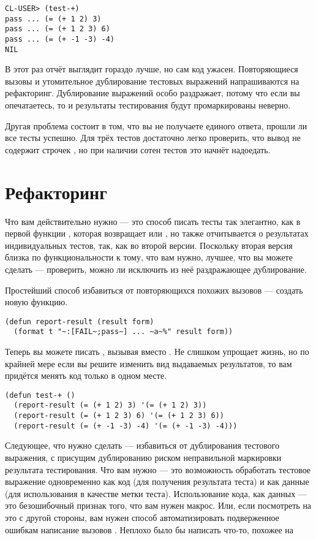 \begin{lstlisting}
CL-USER> (test-+)
pass ... (= (+ 1 2) 3)
pass ... (= (+ 1 2 3) 6)
pass ... (= (+ -1 -3) -4)
NIL
\end{lstlisting}

В этот раз отчёт выглядит гораздо лучше, но сам код ужасен. Повторяющиеся вызовы
 и утомительное дублирование тестовых выражений напрашиваются на
рефакторинг. Дублирование выражений особо раздражает, потому что если вы опечатаетесь, то
и результаты тестирования будут промаркированы неверно.

Другая проблема состоит в том, что вы не получаете единого ответа, прошли ли все
тесты успешно. Для трёх тестов достаточно легко проверить, что вывод не содержит
строчек , но при наличии сотен тестов это начнёт надоедать.

\section{Рефакторинг}

Что вам действительно нужно --- это способ писать тесты так элегантно, как в первой
функции , которая возвращает  или , но также отчитывается о
результатах индивидуальных тестов, так, как во второй версии. Поскольку вторая версия
близка по функциональности к тому, что вам нужно, лучшее, что вы можете сделать ---
проверить, можно ли исключить из неё раздражающее дублирование.

Простейший способ избавиться от повторяющихся похожих вызовов  --- создать
новую функцию.

\begin{lstlisting}
(defun report-result (result form)
  (format t "~:[FAIL~;pass~] ... ~a~%" result form))
\end{lstlisting}

Теперь вы можете писать , вызывая  вместо
. Не слишком упрощает жизнь, но по крайней мере если вы решите изменить вид
выдаваемых результатов, то вам придётся менять код только в одном месте.

\begin{lstlisting}
(defun test-+ ()
  (report-result (= (+ 1 2) 3) '(= (+ 1 2) 3))
  (report-result (= (+ 1 2 3) 6) '(= (+ 1 2 3) 6))
  (report-result (= (+ -1 -3) -4) '(= (+ -1 -3) -4)))
\end{lstlisting}

Следующее, что нужно сделать --- избавиться от дублирования тестового выражения, с
присущим дублированию риском неправильной маркировки результата тестирования. Что вам
нужно --- это возможность обработать тестовое выражение одновременно как код (для
получения результата теста) и как данные (для использования в качестве метки
теста). Использование кода, как данных --- это безошибочный признак того, что вам нужен
макрос. Или, если посмотреть на это с другой стороны, вам нужен способ автоматизировать
подверженное ошибкам написание вызовов . Неплохо было бы написать
что-то, похожее на

